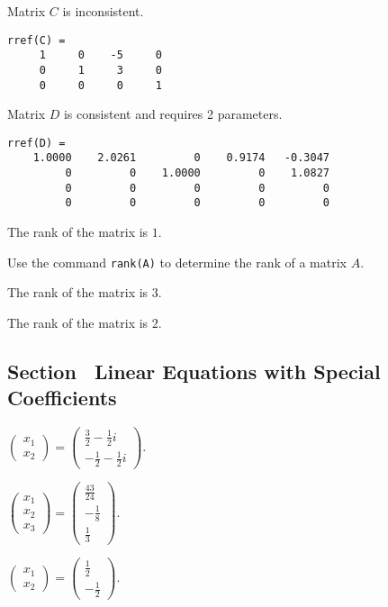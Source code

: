 \documentclass{ximera}
\begin{document}
\ans Matrix $C$ is inconsistent.

\soln
\begin{verbatim}
rref(C) =
     1     0    -5     0
     0     1     3     0
     0     0     0     1
\end{verbatim}

\newpage
{}
\ans Matrix $D$ is consistent and requires 2 parameters.

\soln
\begin{verbatim}
rref(D) =
    1.0000    2.0261         0    0.9174   -0.3047
         0         0    1.0000         0    1.0827
         0         0         0         0         0
         0         0         0         0         0
\end{verbatim}

 \ans The rank of the matrix is $1$.

\soln Use the \Matlab command {\tt rank(A)} to determine the rank of a 
matrix $A$.

 The rank of the matrix is $3$.

 The rank of the matrix is $2$.


\subsection*{Section~\protect{\ref{S:specialcoeff}} Linear Equations with
Special Coefficients}

$\left(\begin{array}{c} x_1 \\ x_2\end{array}\right) =
\left(\begin{array}{r} \frac{3}{2} - \frac{1}{2}i \\ -\frac{1}{2} -
\frac{1}{2}i\end{array}\right).$

$\left(\begin{array}{c} x_1 \\ x_2 \\ x_3\end{array}\right) =
\left(\begin{array}{r} 
\frac{43}{24} \\ -\frac{1}{8} \\ \frac{1}{3} \end{array}\right)$.

$\left(\begin{array}{c} x_1 \\ x_2\end{array}\right) =
\left(\begin{array}{r} \frac{1}{2} \\ -\frac{1}{2} \end{array}\right)$.
\end{document}
